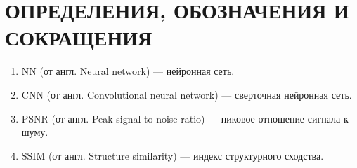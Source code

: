 \section*{ОПРЕДЕЛЕНИЯ, ОБОЗНАЧЕНИЯ И СОКРАЩЕНИЯ}

\begin{enumerate}
	\item NN  (от англ. Neural network) --- нейронная сеть.
	\item CNN (от англ. Convolutional neural network) --- сверточная нейронная сеть. 
	\item PSNR (от англ. Peak signal-to-noise ratio) --- пиковое отношение сигнала к шуму. 
	\item SSIM (от англ. Structure similarity) --- индекс структурного сходства.
\end{enumerate}